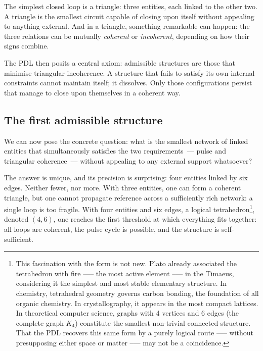 \documentclass[12pt, a4paper, openright]{book}
\begin{document}
\medskip

The simplest closed loop is a triangle: three entities, each linked to the other two. A triangle is the smallest circuit capable of closing upon itself without appealing to anything external. And in a triangle, something remarkable can happen: the three relations can be mutually \emph{coherent} or \emph{incoherent}, depending on how their signs combine.

\medskip

The PDL then posits a central axiom: admissible structures are those that minimise triangular incoherence. A structure that fails to satisfy its own internal constraints cannot maintain itself; it dissolves. Only those configurations persist that manage to close upon themselves in a coherent way.

\subsection*{The first admissible structure}

We can now pose the concrete question: what is the smallest network of linked entities that simultaneously satisfies the two requirements~--- pulse and triangular coherence~--- without appealing to any external support whatsoever?

\medskip

The answer is unique, and its precision is surprising: four entities linked by six edges. Neither fewer, nor more. With three entities, one can form a coherent triangle, but one cannot propagate reference across a sufficiently rich network: a single loop is too fragile. With four entities and six edges, a logical tetrahedron\footnote{This fascination with the form is not new. Plato already associated the tetrahedron with fire —-- the most active element --— in the Timaeus, considering it the simplest and most stable elementary structure. In chemistry, tetrahedral geometry governs carbon bonding, the foundation of all organic chemistry. In crystallography, it appears in the most compact lattices. In theoretical computer science, graphs with 4 vertices and 6 edges (the complete graph $K_4$) constitute the smallest non-trivial connected structure. That the PDL recovers this same form by a purely logical route —-- without presupposing either space or matter --— may not be a coincidence.}, denoted $(4,6)$, one reaches the first threshold at which everything fits together: all loops are coherent, the pulse cycle is possible, and the structure is self-sufficient.
\end{document}
